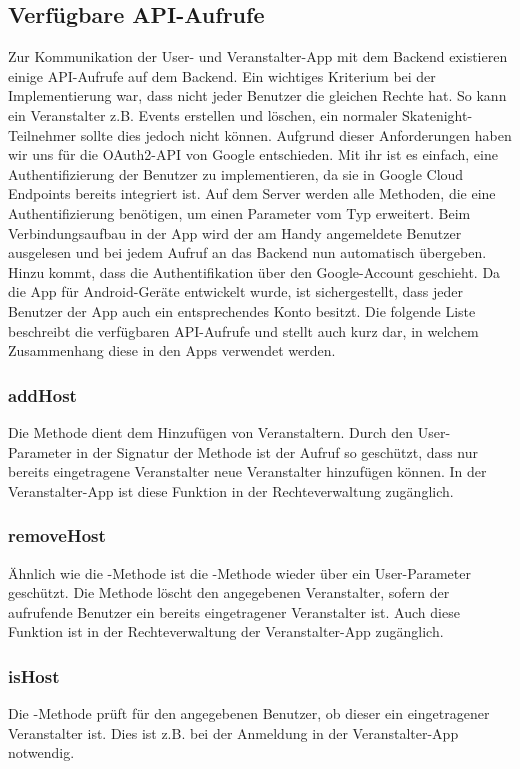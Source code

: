 \subsection{Verfügbare API-Aufrufe}
Zur Kommunikation der User- und Veranstalter-App mit dem Backend existieren einige API-Aufrufe auf dem Backend. Ein wichtiges Kriterium bei der Implementierung war, dass nicht jeder Benutzer die gleichen Rechte hat. So kann ein Veranstalter z.B. Events erstellen und löschen, ein normaler Skatenight-Teilnehmer sollte dies jedoch nicht können. Aufgrund dieser Anforderungen haben wir uns für die OAuth2-API von Google entschieden. Mit ihr ist es einfach, eine Authentifizierung der Benutzer zu implementieren, da sie in Google Cloud Endpoints bereits integriert ist. Auf dem Server werden alle Methoden, die eine Authentifizierung benötigen, um einen Parameter vom Typ  erweitert. Beim Verbindungsaufbau in der App wird der am Handy angemeldete Benutzer ausgelesen und bei jedem Aufruf an das Backend nun automatisch übergeben. Hinzu kommt, dass die Authentifikation über den Google-Account geschieht. Da die App für Android-Geräte entwickelt wurde, ist sichergestellt, dass jeder Benutzer der App auch ein entsprechendes Konto besitzt.
Die folgende Liste beschreibt die verfügbaren API-Aufrufe und stellt auch kurz dar, in welchem Zusammenhang diese in den Apps verwendet werden.

\subsubsection*{addHost}
Die Methode  dient dem Hinzufügen von Veranstaltern. Durch den User-Parameter in der Signatur der Methode ist der Aufruf so geschützt, dass nur bereits eingetragene Veranstalter neue Veranstalter hinzufügen können. In der Veranstalter-App ist diese Funktion in der Rechteverwaltung zugänglich.

\subsubsection*{removeHost}
Ähnlich wie die -Methode ist die -Methode wieder über ein User-Parameter geschützt. Die Methode löscht den angegebenen Veranstalter, sofern der aufrufende Benutzer ein bereits eingetragener Veranstalter ist. Auch diese Funktion ist in der Rechteverwaltung der Veranstalter-App zugänglich.

\subsubsection*{isHost}
Die -Methode prüft für den angegebenen Benutzer, ob dieser ein eingetragener Veranstalter ist. Dies ist z.B. bei der Anmeldung in der Veranstalter-App notwendig.

